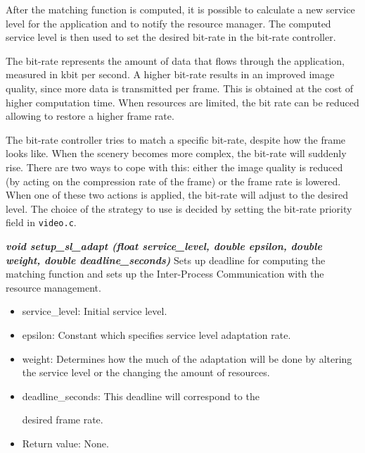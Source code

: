 \documentclass[nobiblatex]{LTHthesis}
\begin{document}
After the matching function is computed, it is possible to calculate a new
service level for the application and to notify the resource manager. The
computed service level is then used to set the desired bit-rate in the 
bit-rate controller.

The bit-rate represents the amount of data that flows through the
application, measured in kbit per second. A higher bit-rate results in an
improved image quality, since more data is transmitted per frame. This is
obtained at the cost of higher computation time. When resources are limited,
the bit rate can be reduced allowing to restore a higher frame rate.

The bit-rate controller tries to match a specific bit-rate, despite how
the frame looks like. When the scenery becomes more complex, the bit-rate
will suddenly rise. There are two ways to cope with this: either the image
quality is reduced (by acting on the compression rate of the frame) or 
the frame rate is lowered. When one of these two actions is applied, the 
bit-rate will adjust to the desired level. The choice of the strategy to 
use is decided by setting the bit-rate priority field in \texttt{video.c}.

\begin{framed}
	\begin{flushleft}	
		\emph{\textbf{{void setup\_sl\_adapt \newline
    (float service\_level, double epsilon, double weight, double deadline\_seconds)}}} \newline
		Sets up deadline for computing the matching function and sets up the 
    Inter-Process Communication with the resource management.
		\begin{itemize}
		\item service\_level: Initial service level.
		\item epsilon: Constant which specifies service level adaptation rate.
		\item weight: Determines how the much of the adaptation will be done 
      by altering the service level or the changing the amount of resources.
		\item deadline\_seconds: This deadline will correspond to the 

      desired frame rate.
		\item Return value: None.
	\end{itemize}
	\end{flushleft}
\end{framed}
\end{document}
